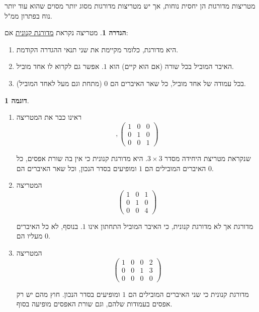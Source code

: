 \documentclass[12pt]{report}
\theoremstyle{plain}
\theoremstyle{definition}
\newtheorem{definition}[theorem]{הגדרה}
\newtheorem{example}{דוגמה}[chapter]
\newcommand{\0}{\mathbf{0}}
\begin{document}
מטריצות מדורגות הן יחסית נוחות, אך יש מטריצות מדורגות מסוג יותר מסוים
שהוא עוד יותר נוח בפתרון ממ"ל.

\begin{definition}
מטריצה נקראת
\underline{מדורגת קנונית}
אם:

\begin{enumerate}[label=\alph*.]
\item
היא מדורגת, כלומר מקיימת את שני תנאי ההגדרה הקודמת.

\item
האיבר המוביל בכל שורה (אם הוא קיים) הוא
$1$.
אפשר גם לקרוא לו אחד מוביל.

\item
בכל עמודה של אחד מוביל, כל שאר האיברים הם $0$ (מתחת וגם מעל לאחד המוביל).
\end{enumerate}
\end{definition}

\begin{example}\
\begin{enumerate}[label=\alph*.]
\item
ראינו כבר את המטריצה
$$
,\begin{pmatrix}1 & 0 & 0\\
0 & 1 & 0\\
0 & 0 & 1
\end{pmatrix}
$$

שנקראת מטריצת היחידה מסדר $3\times3$. היא מדורגת קנונית כי אין
בה שורת אפסים, כל האיברים המובילים הם $1$ ומופיעים בסדר הנכון, וכל
שאר האיברים הם $0$.

\item
המטריצה 
$$
\begin{pmatrix}1 & 0 & 1\\
0 & 1 & 0\\
0 & 0 & 4
\end{pmatrix}
$$

מדורגת אך לא מדורגת קנונית, כי האיבר המוביל התחתון אינו $1$.
בנוסף, לא כל האיברים מעליו הם $0$.

\item
המטריצה 
$$
\begin{pmatrix}1 & 0 & 0 & 2\\
0 & 0 & 1 & 3\\
0 & 0 & 0 & 0
\end{pmatrix}
$$

מדורגת קנונית כי שני האיברים המובילים הם $1$ ומופיעים בסדר הנכון.
חוץ מהם יש רק אפסים בעמודות שלהם, וגם שורת האפסים מופיעה בסוף.
\end{enumerate}
\end{example}
\end{document}
